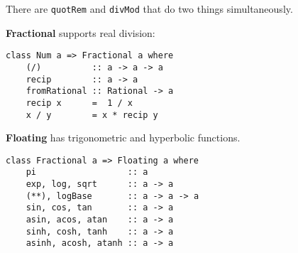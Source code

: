 There are \texttt{quotRem} and \texttt{divMod} that do two things simultaneously.

\textbf{Fractional} supports real division:
\begin{verbatim}
class Num a => Fractional a where
    (/)          :: a -> a -> a
    recip        :: a -> a
    fromRational :: Rational -> a
    recip x      =  1 / x
    x / y        = x * recip y
\end{verbatim}

\textbf{Floating} has trigonometric and hyperbolic functions.
\begin{verbatim}
class Fractional a => Floating a where
    pi                  :: a
    exp, log, sqrt      :: a -> a
    (**), logBase       :: a -> a -> a
    sin, cos, tan       :: a -> a
    asin, acos, atan    :: a -> a
    sinh, cosh, tanh    :: a -> a
    asinh, acosh, atanh :: a -> a
\end{verbatim}






%